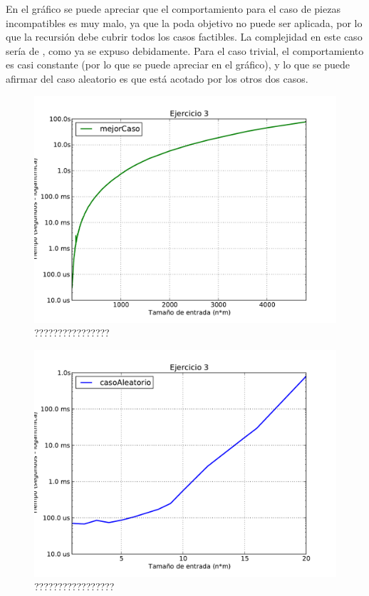 \documentclass[11pt, a4paper, twoside]{article}
\begin{document}
En el gráfico se puede apreciar que el comportamiento para el caso de piezas
incompatibles es muy malo, ya que la poda objetivo no puede ser aplicada, por lo
que la recursión debe cubrir todos los casos factibles. La complejidad en este
caso sería de , como ya se expuso debidamente. Para el caso trivial, el
comportamiento es casi constante (por lo que se puede apreciar en el gráfico), y
lo que se puede afirmar del caso aleatorio es que está acotado por los otros dos
casos.

\begin{figure}[h]
   \begin{center}
   \includegraphics[width=1\textwidth,angle=0]{../ej3/graficos/test_con_podas.pdf}
   \caption{????????????????}
   \label{fig:ej3-3}
   \end{center}
\end{figure}

\begin{figure}[h]
   \begin{center}
   \includegraphics[width=1\textwidth,angle=0]{../ej3/graficos/test_normal.pdf}
   \caption{?????????????????}
   \label{fig:ej3-4}
   \end{center}
\end{figure}

\end{document}
